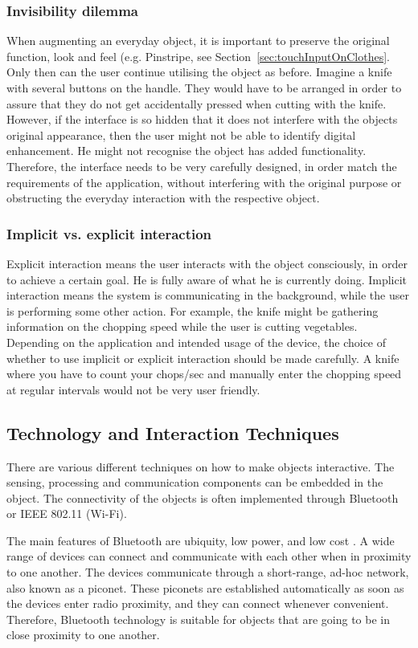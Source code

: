 \subsubsection{Invisibility dilemma}
When augmenting an everyday object, it is important to preserve the original function, look and feel (e.g. Pinstripe, see Section~\ref{sec:touchInputOnClothes}.
Only then can the user continue utilising the object as before. Imagine a knife with several buttons on the handle. They would have to be arranged in order to assure that they do not get accidentally pressed when cutting with the knife.
However, if the interface is so hidden that it does not interfere with the objects original appearance, then the user might not be able to identify digital enhancement.
He might not recognise the object has added functionality.
Therefore, the interface needs to be very carefully designed, in order match the requirements of the application, without interfering with the original purpose or obstructing the everyday interaction with the respective object.

\subsubsection{Implicit vs. explicit interaction}
Explicit interaction means the user interacts with the object consciously, in order to achieve a certain goal.
He is fully aware of what he is currently doing.
Implicit interaction means the system is communicating in the background, while the user is performing some other action.
For example, the knife might be gathering information on the chopping speed while the user is cutting vegetables. Depending on the application and intended usage of the device, the choice of whether to use implicit or explicit interaction should be made carefully.
A knife where you have to count your chops/sec and manually enter the chopping speed at regular intervals would not be very user friendly.

\subsection{Technology and Interaction Techniques}
\label{sec:techniques}
There are various different techniques on how to make objects interactive. 
The sensing, processing and communication components can be embedded in the object.
The connectivity of the objects is often implemented through Bluetooth \cite{bluetoothPatent} or IEEE 802.11 (Wi-Fi).

The main features of Bluetooth are ubiquity, low power, and low cost \cite{btbasics}.
A wide range of devices can connect and communicate with each other when in proximity to one another.
The devices communicate through a short-range, ad-hoc network, also known as a piconet.
These piconets are established automatically as soon as the devices enter radio proximity, and they can connect whenever convenient.
Therefore, Bluetooth technology is suitable for objects that are going to be in close proximity to one another. 

